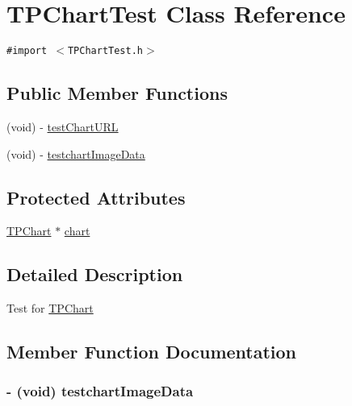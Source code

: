 \hypertarget{interface_t_p_chart_test}{
\section{TPChartTest Class Reference}
\label{interface_t_p_chart_test}
}
{\tt \#import $<$TPChartTest.h$>$}

\subsection*{Public Member Functions}
\begin{CompactItemize}
\item 
(void) - \hyperlink{interface_t_p_chart_test_2fe38433a4c1dd976e0e599da48593e6}{testChartURL}
\item 
(void) - \hyperlink{interface_t_p_chart_test_a618059559f764554a9b011dead57da7}{testchartImageData}
\end{CompactItemize}
\subsection*{Protected Attributes}
\begin{CompactItemize}
\item 
\hyperlink{interface_t_p_chart}{TPChart} $\ast$ \hyperlink{interface_t_p_chart_test_fef5f839997d4ce5f3847a8224f5625d}{chart}
\end{CompactItemize}


\subsection{Detailed Description}
Test for \hyperlink{interface_t_p_chart}{TPChart} 

\subsection{Member Function Documentation}
\hypertarget{interface_t_p_chart_test_a618059559f764554a9b011dead57da7}{
\subsubsection[{testchartImageData}]{\setlength{\rightskip}{0pt plus 5cm}- (void) testchartImageData }}
\label{interface_t_p_chart_test_a618059559f764554a9b011dead57da7}


